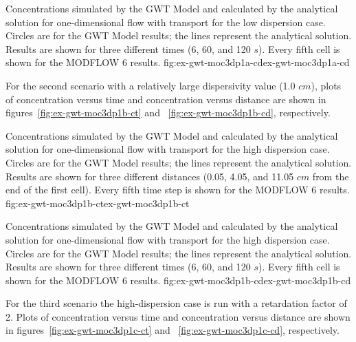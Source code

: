 \begin{StandardFigure}{
                                     Concentrations simulated by the \mf GWT Model and calculated by the analytical solution for one-dimensional flow with transport for the low dispersion case.  Circles are for the GWT Model results; the lines represent the analytical solution.  Results are shown for three different times (6, 60, and 120 $s$).  Every fifth cell is shown for the MODFLOW 6 results.
                                     }{fig:ex-gwt-moc3dp1a-cd}{ex-gwt-moc3dp1a-cd}
\end{StandardFigure}            

For the second scenario with a relatively large dispersivity value (1.0 $cm$), plots of concentration versus time and concentration versus distance are shown in figures~\ref{fig:ex-gwt-moc3dp1b-ct} and ~\ref{fig:ex-gwt-moc3dp1b-cd}, respectively.

\begin{StandardFigure}{
                                     Concentrations simulated by the \mf GWT Model and calculated by the analytical solution for one-dimensional flow with transport for the high dispersion case.  Circles are for the GWT Model results; the lines represent the analytical solution.  Results are shown for three different distances (0.05, 4.05, and 11.05 $cm$ from the end of the first cell).  Every fifth time step is shown for the MODFLOW 6 results.
                                     }{fig:ex-gwt-moc3dp1b-ct}{ex-gwt-moc3dp1b-ct}
\end{StandardFigure}            

\begin{StandardFigure}{
                                     Concentrations simulated by the \mf GWT Model and calculated by the analytical solution for one-dimensional flow with transport for the high dispersion case.  Circles are for the GWT Model results; the lines represent the analytical solution.  Results are shown for three different times (6, 60, and 120 $s$).  Every fifth cell is shown for the MODFLOW 6 results.
                                     }{fig:ex-gwt-moc3dp1b-cd}{ex-gwt-moc3dp1b-cd}
\end{StandardFigure}            

For the third scenario the high-dispersion case is run with a retardation factor of 2.  Plots of concentration versus time and concentration versus distance are shown in figures~\ref{fig:ex-gwt-moc3dp1c-ct} and ~\ref{fig:ex-gwt-moc3dp1c-cd}, respectively.

